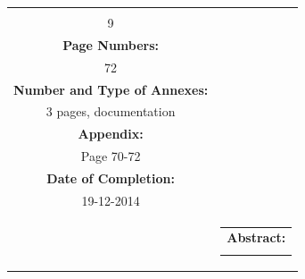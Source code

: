 \begin{titlepage}
\begin{nopagebreak}
{\begin{tabular}{cc}
{\begin{description}
                        \item {\bf Copies:}\\ 9\\
                        \item {\bf Page Numbers:}\\ 72\\
                        \item {\bf Number and Type of Annexes:}\\ 3 pages, documentation\\
                        \item {\bf Appendix:}\\ Page 70-72\\
                        \item {\bf Date of Completion:}\\ 19-12-2014\\
                    \end{description}
                    \vfill
                } &
                \parbox{7cm}{
                    \vspace{.15cm}
                    \hfill 
                    \begin{tabular}{l}
                        {\bf Abstract:}\bigskip \\
                        \fbox{
                            \parbox{6.5cm}{\smallskip
                                {\vfill{\small 
                                \smallskip}}
                            }
                        }
                    \end{tabular}
                }
            \end{tabular}
        }\\
        \\
    \end{nopagebreak}
\end{titlepage}
